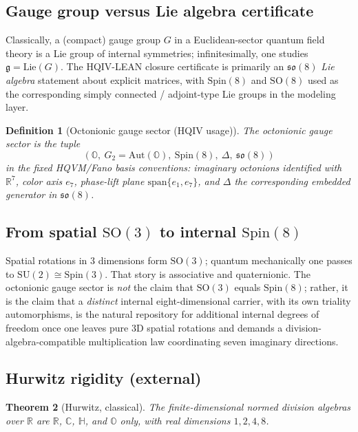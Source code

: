 \documentclass[11pt]{amsart}
\newtheorem{theorem}{Theorem}[section]
\newtheorem{definition}[theorem]{Definition}
\begin{document}
\subsection{Gauge group versus Lie algebra certificate}

Classically, a (compact) gauge group \(G\) in a Euclidean-sector quantum field theory is a Lie group of internal symmetries; infinitesimally, one studies \(\mathfrak{g}=\mathrm{Lie}(G)\). The HQIV-LEAN closure certificate is primarily an \(\mathfrak{so}(8)\) \emph{Lie algebra} statement about explicit matrices, with \(\mathrm{Spin}(8)\) and \(\mathrm{SO}(8)\) used as the corresponding simply connected / adjoint-type Lie groups in the modeling layer.

\begin{definition}[Octonionic gauge sector (HQIV usage)]
\label{def:octonionic-gauge}
The \emph{octonionic gauge sector} is the tuple
\[
(\mathbb{O},\ G_2=\mathrm{Aut}(\mathbb{O}),\ \mathrm{Spin}(8),\ \Delta,\ \mathfrak{so}(8))
\]
in the fixed HQVM/Fano basis conventions: imaginary octonions identified with \(\mathbb{R}^7\), color axis \(e_7\), phase-lift plane \(\mathrm{span}\{e_1,e_7\}\), and \(\Delta\) the corresponding embedded generator in \(\mathfrak{so}(8)\).
\end{definition}

\subsection{From spatial \texorpdfstring{\(\mathrm{SO}(3)\)}{SO(3)} to internal \texorpdfstring{\(\mathrm{Spin}(8)\)}{Spin(8)}}

Spatial rotations in \(3\) dimensions form \(\mathrm{SO}(3)\); quantum mechanically one passes to \(\mathrm{SU}(2)\cong \mathrm{Spin}(3)\). That story is associative and quaternionic. The octonionic gauge sector is \emph{not} the claim that \(\mathrm{SO}(3)\) equals \(\mathrm{Spin}(8)\); rather, it is the claim that a \emph{distinct} internal eight-dimensional carrier, with its own triality automorphisms, is the natural repository for additional internal degrees of freedom once one leaves pure \(3\)D spatial rotations and demands a division-algebra-compatible multiplication law coordinating seven imaginary directions.

\subsection{Hurwitz rigidity (external)}

\begin{theorem}[Hurwitz, classical]
\label{thm:hurwitz}
The finite-dimensional normed division algebras over \(\mathbb{R}\) are \(\mathbb{R}\), \(\mathbb{C}\), \(\mathbb{H}\), and \(\mathbb{O}\) only, with real dimensions \(1,2,4,8\).
\end{theorem}
\end{document}
